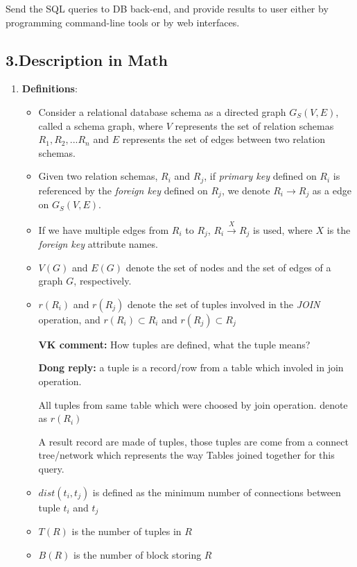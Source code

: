 Send the SQL queries to DB back-end, and provide results to user either by programming command-line tools or by web interfaces.
\begin{center}
{\section*{{\normalsize\bf 3.Description in Math}}}
\end{center}
\begin{enumerate}
\item {\bf Definitions}:
  \begin{itemize}
  \item Consider a relational database schema as a directed graph $G_S(V,E)$, called a schema graph, where $V$ represents the set of relation schemas ${R_1, R_2, ... R_n}$ and $E$ represents the set of edges between two relation schemas.
  \item Given two relation schemas, $R_i$ and $R_j$, if {\it primary key} defined on $R_i$ is referenced by the {\it foreign key} defined on $R_j$, we denote $R_i \rightarrow R_j$ as a edge on $G_S(V,E)$.
  \item If we have multiple edges from $R_i$ to $R_j$, $R_i \stackrel{X}{\longrightarrow} R_j$ is used, where $X$ is the {\it foreign key} attribute names.
  \item $V(G)$ and $E(G)$ denote the set of nodes and the set of edges of a graph $G$, respectively.
  \item $r(R_i)$ and $r(R_j)$ denote the set of tuples involved in the {\it JOIN} operation, and $r(R_i) \subset R_i$ and $r(R_j) \subset R_j$

{\bf VK comment:} How tuples are defined, what the tuple means?

\setlength{\parindent}{0.5in}
{\bf Dong reply:}
a tuple is a record/row from a table which involed in join operation.

All tuples from same table which were choosed by join operation. denote as $r(R_i)$

A result record are made of tuples, those tuples are come from a connect tree/network which represents the way Tables joined together for this query.
\setlength{\parindent}{0.25in}

  \item $dist(t_i,t_j)$ is defined as the minimum number of connections between tuple $t_i$ and $t_j$
  \item $T(R)$ is the number of tuples in $R$


  \item $B(R)$ is the number of block storing $R$


\end{itemize}
\end{enumerate}
